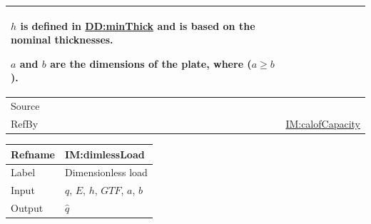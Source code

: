 \documentclass[12pt]{article}
\begin{document}
\begin{minipage}{\textwidth}
\begin{tabular}{>{\raggedright}p{}>{\raggedright\arraybackslash}p{}}
        $h$ is defined in \hyperref[DD:minThick]{DD:minThick} and is based on the nominal thicknesses.
        
        $a$ and $b$ are the dimensions of the plate, where ($a\geq{}b$).
        
\\ \midrule
Source & \cite{astm2009}
         
\\ \midrule
RefBy & \hyperref[IM:calofCapacity]{IM:calofCapacity}
        
\\ \bottomrule
\end{tabular}
\end{minipage}

\medskip
\noindent
\begin{minipage}{\textwidth}
\begin{tabular}{>{\raggedright}p{}>{\raggedright\arraybackslash}p{}}
\toprule \textbf{Refname} & \textbf{IM:dimlessLoad}
\label{IM:dimlessLoad}
\\ \midrule
Label & Dimensionless load
        
\\ \midrule
Input & $q$, $E$, $h$, $\mathit{GTF}$, $a$, $b$
        
\\ \midrule
Output & $\hat{q}$
         

\end{tabular}
\end{minipage}
\end{document}
